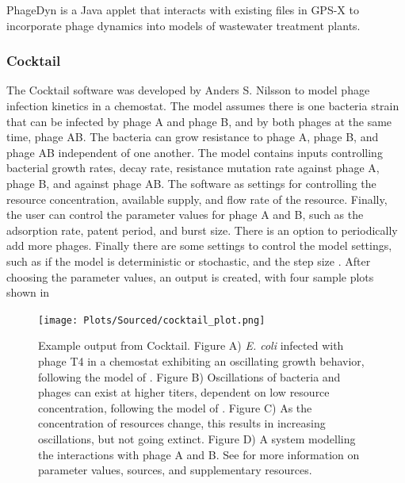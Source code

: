 PhageDyn \cite{krysiak-baltynSimulationPhageDynamics2017} is a Java applet that interacts with existing files in GPS-X \cite{AdvancedWastewaterModelling} to incorporate phage dynamics into models of wastewater treatment plants. 

\subsubsection{Cocktail}
The Cocktail software was developed by Anders S. Nilsson to model phage infection kinetics in a chemostat. 
The model assumes there is one bacteria strain that can be infected by phage A and phage B, and by both phages at the same time, phage AB. 
The bacteria can grow resistance to phage A, phage B, and phage AB independent of one another. 
The model contains inputs controlling bacterial growth rates, decay rate, resistance mutation rate against phage A, phage B, and against phage AB. 
The software as settings for controlling the resource concentration, available supply, and flow rate of the resource. 
Finally, the user can control the parameter values for phage A and B, such as the adsorption rate, patent period, and burst size. 
There is an option to periodically add more phages. 
Finally there are some settings to control the model settings, such as if the model is deterministic or stochastic, and the step size \cite{nilssonCocktailComputerProgram2022}. 
After choosing the parameter values, an output is created, with four sample plots shown in 
\begin{figure}
    \centering
    \texttt{[image: Plots/Sourced/cocktail\_plot.png]}
    \caption{
        Example output from Cocktail. \newline
        Figure A) \textit{E. coli} infected with phage T4 in a chemostat exhibiting an oscillating growth behavior, following the model of \cite{bohannanEffectResourceEnrichment1997}. \newline
        Figure B) Oscillations of bacteria and phages can exist at higher titers, dependent on low resource concentration, following the model of \cite{lenskiDynamicsInteractionsBacteria1988}. \newline
        Figure C) As the concentration of resources change, this results in increasing oscillations, but not going extinct. \newline
        Figure D) A system modelling the interactions with phage A and B. \newline
        See \cite{nilssonCocktailComputerProgram2022} for more information on parameter values, sources, and supplementary resources. 
    }
    \label{fig:cocktail_software_output}
\end{figure}

